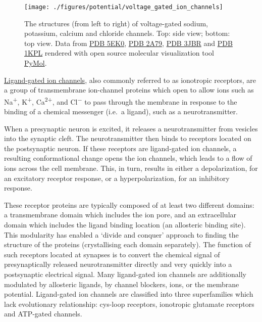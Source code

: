 \begin{figure}

{\centering \texttt{[image: ./figures/potential/voltage\_gated\_ion\_channels]} 

}

\caption{The structures (from left to right) of voltage-gated sodium, potassium, calcium and chloride channels. Top: side view; bottom: top view. Data from \href{https://www.rcsb.org/structure/5EK0}{PDB 5EK0}, \href{https://www.rcsb.org/structure/2A79}{PDB 2A79}, \href{https://www.rcsb.org/structure/3JBR}{PDB 3JBR} and \href{https://www.rcsb.org/structure/1KPL}{PDB 1KPL} rendered with open source molecular visualization tool \href{https://pymol.org/2/}{PyMol}.}\label{fig:ionchannel}
\end{figure}

\href{https://en.wikipedia.org/wiki/Ligand-gated_ion_channel}{Ligand-gated ion channels}, also commonly referred to as ionotropic receptors, are a group of transmembrane ion-channel proteins which open to allow ions such as Na\textsuperscript{+}, K\textsuperscript{+}, Ca\textsuperscript{2+}, and Cl\textsuperscript{−} to pass through the membrane in response to the binding of a chemical messenger (i.e.~a ligand), such as a neurotransmitter.

When a presynaptic neuron is excited, it releases a neurotransmitter from vesicles into the synaptic cleft. The neurotransmitter then binds to receptors located on the postsynaptic neuron. If these receptors are ligand-gated ion channels, a resulting conformational change opens the ion channels, which leads to a flow of ions across the cell membrane. This, in turn, results in either a depolarization, for an excitatory receptor response, or a hyperpolarization, for an inhibitory response.

These receptor proteins are typically composed of at least two different domains: a transmembrane domain which includes the ion pore, and an extracellular domain which includes the ligand binding location (an allosteric binding site). This modularity has enabled a `divide and conquer' approach to finding the structure of the proteins (crystallising each domain separately). The function of such receptors located at synapses is to convert the chemical signal of presynaptically released neurotransmitter directly and very quickly into a postsynaptic electrical signal. Many ligand-gated ion channels are additionally modulated by allosteric ligands, by channel blockers, ions, or the membrane potential. Ligand-gated ion channels are classified into three superfamilies which lack evolutionary relationship: cys-loop receptors, ionotropic glutamate receptors and ATP-gated channels.

